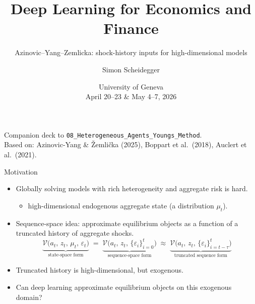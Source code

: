 \documentclass[aspectratio=169,11pt]{beamer}
\title[Deep Learning -- Geneva 2026]%
{Deep Learning for Economics and Finance}
\subtitle{Azinovic--Yang--Zemlicka: shock-history inputs for high-dimensional models}
\author{Simon Scheidegger}
\institute[HEC Lausanne]{HEC, University of Lausanne}
\date{University of Geneva\\April 20--23 \& May 4--7, 2026}
\newcommand{\emphc}[1]{\textcolor{harvardcrimson}{#1}}
\begin{document}
{
\begin{frame}
\titlepage
\vspace{-0.4cm}
\begin{center}
{\footnotesize Companion deck to \texttt{08\_Heterogeneous\_Agents\_Youngs\_Method}.}\\[4pt]
{\footnotesize Based on: Azinovic-Yang \& \v{Z}emli\v{c}ka (2025), Boppart et al.\ (2018), Auclert et al.\ (2021).}
\end{center}
\end{frame}
}


\begin{frame}{Motivation}
\small
\begin{itemize}\itemsep6pt
\item Globally solving models with rich \emphc{heterogeneity} and \emphc{aggregate risk} is hard.
    \begin{itemize}
        \item[$\rightarrow$] high-dimensional \emphc{endogenous} aggregate state (a distribution $\mu_t$).
    \end{itemize}

\item \emphc{Sequence-space idea:} approximate equilibrium objects as a function of a \emphc{truncated history of aggregate shocks}.
\[
\underbrace{\mathcal{V}\bigl(a_t,\, z_t,\, \mu_t,\, \varepsilon_t\bigr)}_{\text{state-space form}}
\;=\;
\underbrace{\mathcal{V}\bigl(a_t,\, z_t,\, \{\varepsilon_i\}_{i=0}^{t}\bigr)}_{\text{sequence-space form}}
\;\approx\;
\underbrace{\mathcal{V}\bigl(a_t,\, z_t,\, \{\varepsilon_i\}_{i=t-\tau}^{t}\bigr)}_{\text{truncated sequence form}}
\]

\item Truncated history is high-dimensional, but \emphc{exogenous}.
\item Can deep learning approximate equilibrium objects on this exogenous domain?
\end{itemize}
\end{frame}
\end{document}
